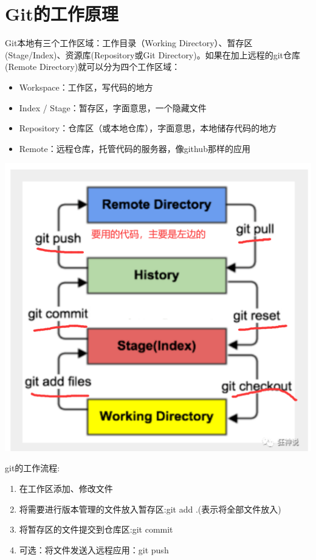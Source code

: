 \documentclass{article}
\begin{document}
\section{Git的工作原理}
Git本地有三个工作区域：工作目录（Working Directory）、暂存区(Stage/Index)、资源库(Repository或Git Directory)。如果在加上远程的git仓库(Remote Directory)就可以分为四个工作区域：

\begin{itemize}
    \item Workspace：工作区，写代码的地方
    \item Index / Stage：暂存区，字面意思，一个隐藏文件
    \item Repository：仓库区（或本地仓库），字面意思，本地储存代码的地方
    \item Remote：远程仓库，托管代码的服务器，像github那样的应用
\end{itemize}

\centering
\includegraphics{image/7.1.png}

git的工作流程:
\begin{enumerate}
    \item 在工作区添加、修改文件
    \item 将需要进行版本管理的文件放入暂存区:git add .(表示将全部文件放入)
    \item 将暂存区的文件提交到仓库区:git commit
    \item 可选：将文件发送入远程应用：git push
\end{enumerate}
\end{document}
